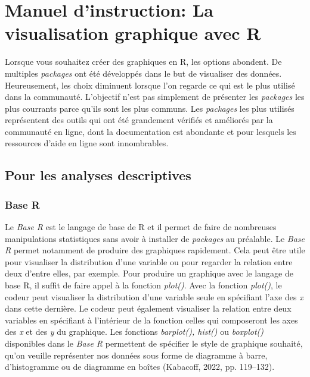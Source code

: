 \documentclass[
  letterpaper,
  DIV=11,
  numbers=noendperiod]{scrreprt}
\begin{document}
\section{Manuel d'instruction: La visualisation graphique avec
R}\label{manuel-dinstruction-la-visualisation-graphique-avec-r}

Lorsque vous souhaitez créer des graphiques en R, les options abondent.
De multiples \emph{packages} ont été développés dans le but de
visualiser des données. Heureusement, les choix diminuent lorsque l'on
regarde ce qui est le plus utilisé dans la communauté. L'objectif n'est
pas simplement de présenter les \emph{packages} les plus courrants parce
qu'ils sont les plus communs. Les \emph{packages} les plus utilisés
représentent des outils qui ont été grandement vérifiés et améliorés par
la communauté en ligne, dont la documentation est abondante et pour
lesquels les ressources d'aide en ligne sont innombrables.

\subsection{Pour les analyses
descriptives}\label{pour-les-analyses-descriptives}

\subsubsection{Base R}\label{base-r}

Le \emph{Base R} est le langage de base de R et il permet de faire de
nombreuses manipulations statistiques sans avoir à installer de
\emph{packages} au préalable. Le \emph{Base R} permet notamment de
produire des graphiques rapidement. Cela peut être utile pour visualiser
la distribution d'une variable ou pour regarder la relation entre deux
d'entre elles, par exemple. Pour produire un graphique avec le langage
de base R, il suffit de faire appel à la fonction \emph{plot()}. Avec la
fonction \emph{plot()}, le codeur peut visualiser la distribution d'une
variable seule en spécifiant l'axe des \emph{x} dans cette dernière. Le
codeur peut également visualiser la relation entre deux variables en
spécifiant à l'intérieur de la fonction celles qui composeront les axes
des \emph{x} et des \emph{y} du graphique. Les fonctions
\emph{barplot(), hist()} ou \emph{boxplot()} disponibles dans le
\emph{Base R} permettent de spécifier le style de graphique souhaité,
qu'on veuille représenter nos données sous forme de diagramme à barre,
d'histogramme ou de diagramme en boîtes (Kabacoff, 2022, pp. 119--132).
\end{document}
